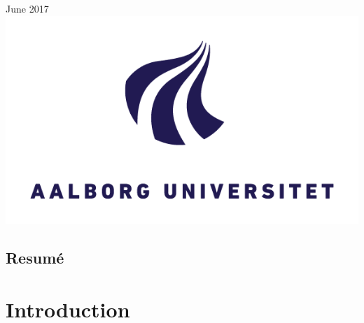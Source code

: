\documentclass[a4paper]{report}
\theoremstyle{plain}
\begin{document}
\begin{titlepage}


{\large June 2017}\\[2cm] %


\includegraphics{AAU_LOGO.png}\\[1cm] %
 

\vfill %

\end{titlepage}



\chapter*{Resumé}

\clearpage

\tableofcontents


\part{Introduction}
\clearpage
\end{document}
